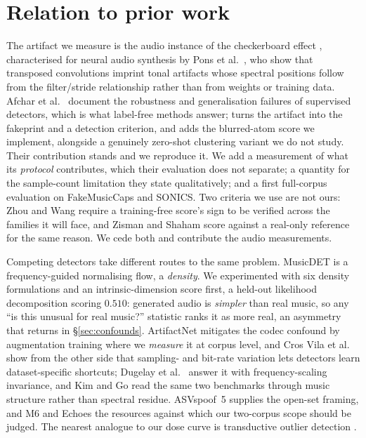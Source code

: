 \documentclass{article}
\begin{document}
\section{Relation to prior work}
\label{sec:prior}

The artifact we measure is the audio instance of the checkerboard effect
\cite{odena2016deconvolution}, characterised for neural audio synthesis by Pons
et al.\ \cite{pons2021upsampling}, who show that transposed convolutions imprint
tonal artifacts whose spectral positions follow from the filter/stride
relationship rather than from weights or training data. Afchar et al.\
\cite{afchar2025challenges} document the robustness and generalisation failures of
supervised detectors, which is what label-free methods answer; \cite{afchar2025fourier}
turns the artifact into the fakeprint and a detection criterion, and
\cite{afchar2026finding} adds the blurred-atom score we implement, alongside a
genuinely zero-shot clustering variant we do not study. Their contribution stands
and we reproduce it. We add a measurement of what its \emph{protocol} contributes, which
their evaluation does not separate; a quantity for the sample-count limitation
they state qualitatively; and a first full-corpus evaluation on FakeMusicCaps
\cite{comanducci2025fakemusiccaps} and SONICS. Two criteria we use are not ours: Zhou and Wang \cite{zhou2026fragile} require a
training-free score's sign to be verified across the families it will face, and
Zisman and Shaham \cite{zisman2026realstats} score against a real-only reference
for the same reason. We cede both and contribute the audio measurements.

Competing detectors take different routes to the same problem. MusicDET
\cite{han2026musicdet} is a frequency-guided normalising flow, a
\emph{density}. We experimented with six density formulations
\cite{nalisnick2019typicality,serra2020input} and an intrinsic-dimension score
\cite{tulchinskii2023intrinsic} first, a held-out likelihood decomposition
scoring $0.510$: generated audio is \emph{simpler} than real music, so any ``is
this unusual for real music?'' statistic ranks it as more real, an asymmetry that
returns in \S\ref{sec:confounds}. ArtifactNet
\cite{oh2026artifactnet} mitigates the codec confound by augmentation training
where we \emph{measure} it at corpus level, and Cros Vila et al.\
\cite{crosvila2025armsrace} show from the other side that sampling- and bit-rate
variation lets detectors learn dataset-specific shortcuts; Dugelay et al.\
\cite{dugelay2026improved} answer it with frequency-scaling invariance, and Kim and
Go \cite{kim2025segment} read the same two benchmarks through music structure rather
than spectral residue. ASVspoof~5 \cite{wang2025asvspoof5} supplies the open-set framing, and M6
\cite{li2026m6} and Echoes \cite{pascu2026echoes} the resources against which our
two-corpus scope should be judged. The nearest analogue to our dose curve is
transductive outlier detection \cite{kluttermann2024transductive}.
\end{document}
